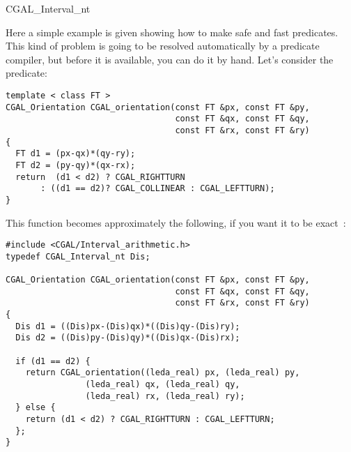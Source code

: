\begin{ccClass} {CGAL_Interval_nt}
\ccExample

Here a simple example is given showing how to make safe and fast predicates.
This kind of problem is going to be resolved automatically by a predicate
compiler, but before it is available, you can do it by hand.
Let's consider the  predicate:

\begin{verbatim}
template < class FT >
CGAL_Orientation CGAL_orientation(const FT &px, const FT &py,
                                  const FT &qx, const FT &qy,
                                  const FT &rx, const FT &ry)
{
  FT d1 = (px-qx)*(qy-ry);
  FT d2 = (py-qy)*(qx-rx);
  return  (d1 < d2) ? CGAL_RIGHTTURN
       : ((d1 == d2)? CGAL_COLLINEAR : CGAL_LEFTTURN);
}
\end{verbatim}

This function becomes approximately the following, if you want it to be exact~:

\begin{verbatim}
#include <CGAL/Interval_arithmetic.h>
typedef CGAL_Interval_nt Dis;

CGAL_Orientation CGAL_orientation(const FT &px, const FT &py,
                                  const FT &qx, const FT &qy,
                                  const FT &rx, const FT &ry)
{
  Dis d1 = ((Dis)px-(Dis)qx)*((Dis)qy-(Dis)ry);
  Dis d2 = ((Dis)py-(Dis)qy)*((Dis)qx-(Dis)rx);

  if (d1 == d2) {
    return CGAL_orientation((leda_real) px, (leda_real) py,
			    (leda_real) qx, (leda_real) qy,
			    (leda_real) rx, (leda_real) ry);
  } else {
    return (d1 < d2) ? CGAL_RIGHTTURN : CGAL_LEFTTURN;
  };
}
\end{verbatim}

\end{ccClass}

